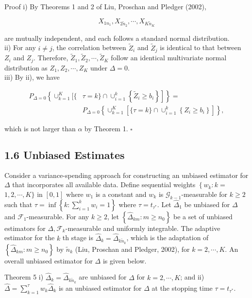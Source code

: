 \documentclass[10pt]{article}
\begin{document}
Proof i) By Theorems 1 and 2 of Liu, Proschan and Pledger (2002),

$$
X_{1 n_{1}}, X_{2 \tilde{n}_{2}}, \cdots, X_{K \tilde{n}_{K}}
$$

are mutually independent, and each follows a standard normal distribution.\\
ii) For any $i \neq j$, the correlation between $\tilde{Z}_{i}$ and $\tilde{Z}_{j}$ is identical to that between $Z_{i}$ and $Z_{j}$. Therefore, $\tilde{Z}_{1}, \tilde{Z}_{2}, \cdots, \tilde{Z}_{K}$ follow an identical multivariate normal distribution as $Z_{1}, Z_{2}, \cdots, Z_{K}$ under $\Delta=0$.\\
iii) By ii), we have

$$
\begin{aligned}
P_{\Delta=0}\left\{\cup_{k=1}^{K}[\{ \right. & \left.\left.\tau=k\} \cap \cup_{i=1}^{k}\left\{\tilde{Z}_{i} \geq b_{i}\right\}\right]\right\}= \\
& P_{\Delta=0}\left\{\cup_{k=1}^{K}\left[\{\tau=k\} \cap \cup_{i=1}^{k}\left\{Z_{i} \geq b_{i}\right\}\right]\right\},
\end{aligned}
$$

which is not larger than $\alpha$ by Theorem 1. \(\square\)

\subsection*{1.6 Unbiased Estimates}
Consider a variance-spending approach for constructing an unbiased estimator for $\Delta$ that incorporates all available data. Define sequential weights $\left\{w_{k}: k=\right.$ $1,2, \cdots, K\}$ in $[0,1]$ where $w_{1}$ is a constant and $w_{k}$ is $\mathcal{G}_{k-1}$-measurable for $k \geq 2$ such that $\tau=\inf \left\{k: \sum_{i=1}^{k} w_{i}=1\right\}$ where $\tau=t_{\tau^{*}}$. Let $\hat{\Delta}_{1}$ be unbiased for $\Delta$ and $\mathcal{F}_{1}$-measurable. For any $k \geq 2$, let $\left\{\hat{\Delta}_{k m}: m \geq n_{0}\right\}$ be a set of unbiased estimators for $\Delta, \mathcal{F}_{k}$-measurable and uniformly integrable. The adaptive estimator for the $k$ th stage is $\hat{\Delta}_{k}=\hat{\Delta}_{k \tilde{n}_{k}}$, which is the adaptation of $\left\{\hat{\Delta}_{k m}: m \geq n_{0}\right\}$ by $\tilde{n}_{k}$ (Liu, Proschan and Pledger, 2002), for $k=2, \cdots, K$. An overall unbiased estimator for $\Delta$ is given below.

Theorem 5 i) $\hat{\Delta}_{k}=\hat{\Delta}_{k \tilde{n}_{k}}$ are unbiased for $\Delta$ for $k=2, \cdots, K$; and ii) $\hat{\Delta}=\sum_{k=1}^{\tau} w_{k} \hat{\Delta}_{k}$ is an unbiased estimator for $\Delta$ at the stopping time $\tau=t_{\tau^{*}}$.
\end{document}
